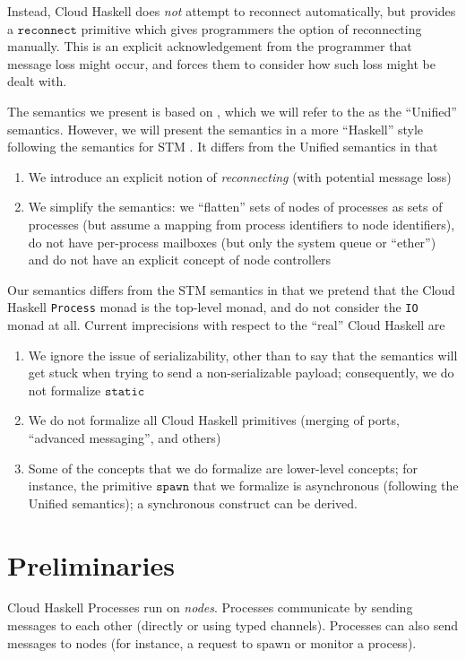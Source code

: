 \documentclass{article}
\newcommand{\sSpawn}{\mathtt{spawn}}
\newcommand{\sReconnect}{\mathtt{reconnect}}
\begin{document}
Instead, Cloud Haskell does \emph{not} attempt to reconnect automatically, but
provides a $\sReconnect$ primitive which gives programmers the option of
reconnecting manually. This is an explicit acknowledgement from the programmer
that message loss might occur, and forces them to consider how such loss might
be dealt with. 

The semantics we present is based on \cite{unified}, which we will refer to the
as the ``Unified'' semantics. However, we will present the semantics in a more
``Haskell'' style following the semantics for STM \cite{stm}. It differs from
the Unified semantics in that
%
\begin{enumerate}
\item We introduce an explicit notion of \textit{reconnecting} (with potential
message loss)
\item We simplify the semantics: we ``flatten'' sets of nodes of processes as
sets of processes (but assume a mapping from process identifiers to node
identifiers), do not have per-process mailboxes (but only the system queue or
``ether'') and do not have an explicit concept of node controllers
\end{enumerate}
%
Our semantics differs from the STM semantics in that we pretend that the Cloud
Haskell \texttt{Process} monad is the top-level monad, and do not consider the
\texttt{IO} monad at all.  Current imprecisions with respect to the ``real''
Cloud Haskell are
%
\begin{enumerate}
\item We ignore the issue of serializability, other than to say that the
semantics will get stuck when trying to send a non-serializable payload;
consequently, we do not formalize $\mathtt{static}$
\item We do not formalize all Cloud Haskell primitives (merging of ports,
``advanced messaging'', and others)
\item Some of the concepts that we do formalize are lower-level concepts; for
instance, the primitive $\sSpawn$ that we formalize is asynchronous (following
the Unified semantics); a synchronous construct can be derived.
\end{enumerate}

\section{Preliminaries}

Cloud Haskell Processes run on \emph{nodes}. Processes communicate by sending
messages to each other (directly or using typed channels). Processes can also
send messages to nodes (for instance, a request to spawn or monitor a process).
\end{document}
